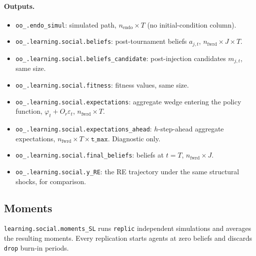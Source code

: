 \documentclass[11pt,a4paper]{article}
\newcommand{\option}[1]{\texttt{#1}}
\newcommand{\field}[1]{\texttt{#1}}
\begin{document}
\paragraph{Outputs.}
\begin{itemize}[leftmargin=2em]
\item \field{oo\_.endo\_simul}: simulated path,
      $n_{\text{endo}} \times T$ (no initial-condition column).
\item \field{oo\_.learning.social.beliefs}: post-tournament beliefs
      $a_{j,t}$, $n_{\text{fwrd}} \times J \times T$.
\item \field{oo\_.learning.social.beliefs\_candidate}: post-injection
      candidates $m_{j,t}$, same size.
\item \field{oo\_.learning.social.fitness}: fitness values, same size.
\item \field{oo\_.learning.social.expectations}: aggregate wedge entering
      the policy function, $\varphi_t + O_r\varepsilon_t$,
      $n_{\text{fwrd}} \times T$.
\item \field{oo\_.learning.social.expectations\_ahead}: $h$-step-ahead
      aggregate expectations, $n_{\text{fwrd}} \times T \times \mathtt{t\_max}$.
      Diagnostic only.
\item \field{oo\_.learning.social.final\_beliefs}: beliefs at $t = T$,
      $n_{\text{fwrd}} \times J$.
\item \field{oo\_.learning.social.y\_RE}: the RE trajectory under the same
      structural shocks, for comparison.
\end{itemize}



\subsection{Moments}
\label{sec:simulation:moments}

\texttt{learning.social.moments\_SL} runs \option{replic} independent
simulations and averages the
resulting moments. Every replication starts agents at zero beliefs and
discards \option{drop} burn-in periods.
\end{document}
